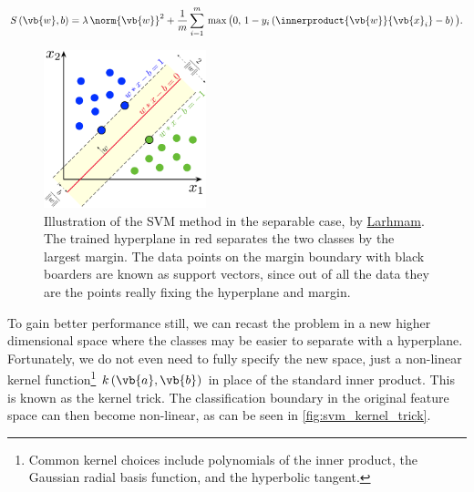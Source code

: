 \begin{equation} \label{eq:svm:soft_margin_obj}
S\left(\vb{w}, b\right) =
\lambda\, \norm{\vb{w}}^{2}
+ \frac{1}{m} \sum_{i=1}^{m} \,
\max{\big(0,\, 1 - y_{i} \left(\innerproduct{\vb{w}}{\vb{x}_{i}} - b\right)\big)}.
\end{equation}

\begin{figure}[H]
\centering
\includegraphics[width=0.42\textwidth]{figures/ml/svm_margin.png}
\vspace{0.2cm}
\caption{
Illustration of the SVM method in the separable case,
by \href{https://en.wikipedia.org/wiki/File:SVM_margin.png}{Larhmam}.
The trained hyperplane in red separates the two classes by the largest margin.
The data points on the margin boundary with black boarders
are known as support vectors, since out of all the data
they are the points really fixing the hyperplane and margin.
}
\label{fig:svm_sep}
\end{figure}

To gain better performance still, we can recast the problem in
a new higher dimensional space where the classes may be easier to separate with a hyperplane.
Fortunately, we do not even need to fully specify the new space,
just a non-linear kernel function\footnote{Common kernel choices include
polynomials of the inner product,
the Gaussian radial basis function,
and the hyperbolic tangent.} $k\left(\vb{a},\vb{b}\right)$
in place of the standard inner product. This is known as the kernel trick.
The classification boundary in the original feature space can then become non-linear,
as can be seen in \cref{fig:svm_kernel_trick}.

\vspace{-0.3cm}%

